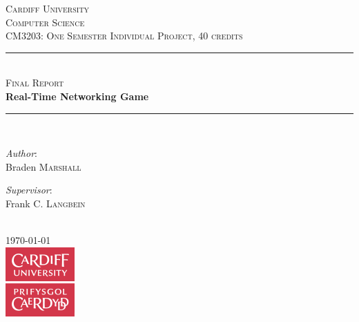 \documentclass{standalone}
\begin{document}
	

	\newcommand{\HRule}{\rule{\linewidth}{0.5mm}}

	\center

	\textsc{\LARGE Cardiff University}\\[1.5cm]
	\textsc{\Large Computer Science}\\[0.5cm]
	\textsc{\large CM3203: One Semester Individual Project, 40 credits}\\[0.5cm]

	\HRule\\[0.4cm]
	{\textsc{\large Final Report}}\\[0.5cm]
	{\huge\bfseries Real-Time Networking Game}\\[0.25cm]
	\HRule\\[1.5cm]

	\begin{minipage}[t]{0.4\textwidth}
		\begin{flushleft} \large
			\emph{Author}: \\
			Braden \textsc{Marshall}
		\end{flushleft}
	\end{minipage}
	\begin{minipage}[t]{0.4\textwidth}
		\begin{flushright} \large
			\emph{Supervisor}: \\
			Frank C. \textsc{Langbein}
		\end{flushright}
	\end{minipage}\\[2cm]

	{\large \today}\\[1.5cm]
	\includegraphics{resources/cardiffuniversity.png}\\[1cm]

	\vfill
\end{document}
